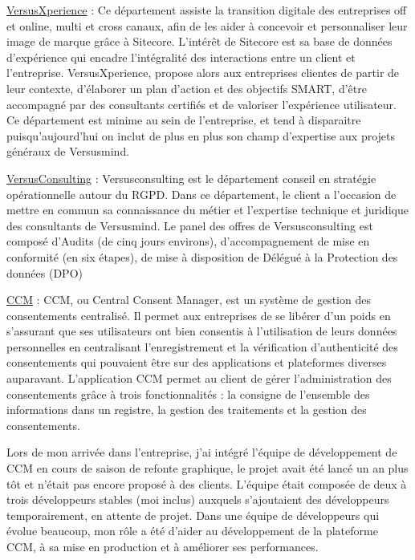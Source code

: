 \documentclass[12pt, a4paper]{report}
\begin{document}
\underline{VersusXperience} : Ce département assiste la transition digitale des entreprises off et online, multi et
cross canaux, afin de les aider à concevoir et personnaliser leur image de marque grâce à Sitecore.
L’intérêt de Sitecore est sa base de données d’expérience qui encadre l’intégralité des interactions
entre un client et l’entreprise. VersusXperience, propose alors aux entreprises clientes de partir de leur
contexte, d’élaborer un plan d’action et des objectifs SMART, d’être accompagné par des consultants
certifiés et de valoriser l’expérience utilisateur. Ce département est minime au sein de l’entreprise, et
tend à disparaitre puisqu’aujourd’hui on inclut de plus en plus son champ d’expertise aux projets
généraux de Versusmind.\newline

\underline{VersusConsulting} : Versusconsulting est le département conseil en stratégie opérationnelle autour du
RGPD. Dans ce département, le client a l’occasion de mettre en commun sa connaissance du métier et
l’expertise technique et juridique des consultants de Versusmind. Le panel des offres de
Versusconsulting est composé d’Audits (de cinq jours environs), d’accompagnement de mise en
conformité (en six étapes), de mise à disposition de Délégué à la Protection des données (DPO)\newline

\underline{CCM} : CCM, ou Central Consent Manager, est un système de gestion des consentements centralisé. Il
permet aux entreprises de se libérer d’un poids en s’assurant que ses utilisateurs ont bien consentis à
l’utilisation de leurs données personnelles en centralisant l’enregistrement et la vérification
d’authenticité des consentements qui pouvaient être sur des applications et plateformes diverses
auparavant. L’application CCM permet au client de gérer l’administration des consentements grâce à
trois fonctionnalités : la consigne de l’ensemble des informations dans un registre, la gestion des
traitements et la gestion des consentements.\newline

Lors de mon arrivée dans l’entreprise, j’ai intégré l’équipe de développement de CCM en cours de
saison de refonte graphique, le projet avait été lancé un an plus tôt et n’était pas encore proposé à des
clients. L’équipe était composée de deux à trois développeurs stables (moi inclus) auxquels s’ajoutaient
des développeurs temporairement, en attente de projet.
Dans une équipe de développeurs qui évolue beaucoup, mon rôle a été d'aider au développement de la plateforme CCM, à sa mise en production et à améliorer ses performances.
\end{document}
